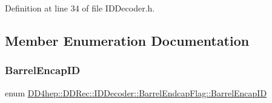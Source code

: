 Definition at line 34 of file I\+D\+Decoder.\+h.



\subsection{Member Enumeration Documentation}
\hypertarget{class_d_d4hep_1_1_d_d_rec_1_1_i_d_decoder_1_1_barrel_endcap_flag_acbdae4d36c49605ada531eddce7b60d8}{}\label{class_d_d4hep_1_1_d_d_rec_1_1_i_d_decoder_1_1_barrel_endcap_flag_acbdae4d36c49605ada531eddce7b60d8} 
\subsubsection{\texorpdfstring{Barrel\+Encap\+ID}{BarrelEncapID}}
{\footnotesize\ttfamily enum \hyperlink{class_d_d4hep_1_1_d_d_rec_1_1_i_d_decoder_1_1_barrel_endcap_flag_acbdae4d36c49605ada531eddce7b60d8}{D\+D4hep\+::\+D\+D\+Rec\+::\+I\+D\+Decoder\+::\+Barrel\+Endcap\+Flag\+::\+Barrel\+Encap\+ID}}

